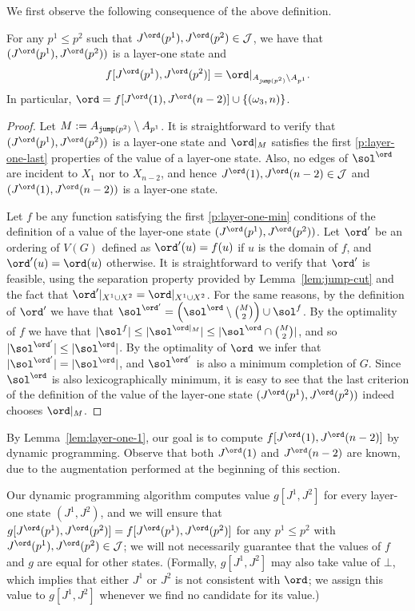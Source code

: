 We first observe the following consequence of the above definition.
\begin{lemma}\label{lem:layer-one-1}
For any $p^1 \leq p^2$ such that $J^\ord(p^1),J^\ord(p^2) \in \jumpfam$, we have that $(J^\ord(p^1),J^\ord(p^2))$ is a layer-one state and
$$f[J^\ord(p^1),J^\ord(p^2)] = \ord|_{\secp{\jump{p^2}} \setminus \secp{p^1}}.$$
In particular, $\ord=f[J^\ord(1),J^\ord(n-2)]\cup \{(\omega_3,n)\}$.
\end{lemma}
\begin{proof}
Let $M:=A_{\mathtt{jump}(p^2)} \setminus A_{p^1}$. It is straightforward to verify that $(J^\ord(p^1),J^\ord(p^2))$ is a layer-one state
and $\ord|_M$ satisfies the first \ref{p:layer-one-last} properties of the value of a layer-one state.
Also, no edges of $\sol^\ord$ are incident to $X_1$ nor to $X_{n-2}$, and hence $J^\ord(1),J^\ord(n-2) \in \jumpfam$ and
$(J^\ord(1),J^\ord(n-2))$ is a layer-one state.

Let $f$ be any function satisfying the first \ref{p:layer-one-min} conditions of the definition
of a value of the layer-one state $(J^\ord(p^1),J^\ord(p^2))$.
Let $\ord'$ be an ordering of $V(G)$ defined as $\ord'(u) = f(u)$ if $u$ is the domain of $f$, and $\ord'(u) = \ord(u)$ otherwise.
It is straightforward to verify that $\ord'$ is feasible, using the separation property provided by Lemma~\ref{lem:jump-cut} and the fact that $\ord'|_{X^1\cup X^2}=\ord|_{X^1\cup X^2}$.
For the same reasons, by the definition of $\ord'$ we have that $\sol^{\ord'}=\left(\sol^{\ord}\setminus \binom{M}{2}\right)\cup \sol^f$. By the optimality of $f$ we have that $|\sol^f|\leq |\sol^{\ord|_{M}}|\leq |\sol^{\ord}\cap \binom{M}{2}|$, and so $|\sol^{\ord'}|\leq |\sol^\ord|$. By the optimality of $\ord$ we infer that $|\sol^{\ord'}|=|\sol^{\ord}|$, and $\sol^{\ord'}$ is also a minimum completion of $G$.
Since $\sol^\ord$ is also lexicographically minimum, it is easy to see that the last criterion of the definition of the value of the layer-one state $(J^\ord(p^1),J^\ord(p^2))$ indeed chooses $\ord|_{M}$.
\end{proof}
By Lemma~\ref{lem:layer-one-1}, our goal is to compute $f[J^\ord(1),J^\ord(n-2)]$ by dynamic programming. Observe
that both $J^\ord(1)$ and $J^\ord(n-2)$ are known, due to the augmentation performed at the beginning of this section.

Our dynamic programming algorithm computes value $g[J^1,J^2]$ for every
layer-one state $(J^1,J^2)$, and we will ensure that $g[J^\ord(p^1),J^\ord(p^2)] = f[J^\ord(p^1),J^\ord(p^2)]$ for any $p^1 \leq p^2$ with $J^\ord(p^1),J^\ord(p^2) \in \jumpfam$;
we will not necessarily guarantee that the values of $f$
and $g$ are equal for other states.
(Formally, $g[J^1,J^2]$ may also take value of $\bot$, which implies that either $J^1$ or $J^2$ is not consistent with $\ord$;
 we assign this value to $g[J^1,J^2]$ whenever we find no candidate for its value.)

